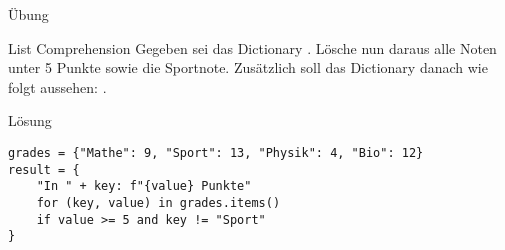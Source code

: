 \begin{fragile}{Übung}

\begin{block}{List Comprehension}
\vspace{2pt}
Gegeben sei das Dictionary 
. 
Lösche nun daraus alle Noten unter 5 Punkte sowie die Sportnote. Zusätzlich soll das Dictionary danach wie folgt aussehen: 
. 

\end{block}


\vspace{12pt}

\begin{solutionblock}{Lösung}
\begin{verbatim}
grades = {"Mathe": 9, "Sport": 13, "Physik": 4, "Bio": 12}
result = {
    "In " + key: f"{value} Punkte"
    for (key, value) in grades.items()
    if value >= 5 and key != "Sport"
}
\end{verbatim}
\end{solutionblock}

\end{fragile}





























